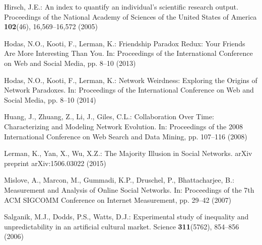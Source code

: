 \documentclass[smallextended]{svjour3}
\begin{document}
\begin{thebibliography}{10}
Hirsch, J.E.: An index to quantify an individual's scientific research output.
\newblock Proceedings of the National Academy of Sciences of the United States
  of America \textbf{102}(46), 16,569--16,572 (2005)

Hodas, N.O., Kooti, F., Lerman, K.: {Friendship Paradox Redux: Your Friends Are
  More Interesting Than You}.
\newblock In: Proceedings of the International Conference on Web and Social
  Media, pp. 8--10 (2013)

Hodas, N.O., Kooti, F., Lerman, K.: {Network Weirdness: Exploring the Origins
  of Network Paradoxes}.
\newblock In: Proceedings of the International Conference on Web and Social
  Media, pp. 8--10 (2014)

Huang, J., Zhuang, Z., Li, J., Giles, C.L.: {Collaboration Over Time:
  Characterizing and Modeling Network Evolution}.
\newblock In: Proceedings of the 2008 International Conference on Web Search
  and Data Mining, pp. 107--116 (2008)

Lerman, K., Yan, X., Wu, X.Z.: {The Majority Illusion in Social Networks}.
\newblock arXiv preprint arXiv:1506.03022  (2015)

Mislove, A., Marcon, M., Gummadi, K.P., Druschel, P., Bhattacharjee, B.:
  {Measurement and Analysis of Online Social Networks}.
\newblock In: Proceedings of the 7th ACM SIGCOMM Conference on Internet
  Measurement, pp. 29--42 (2007)

Salganik, M.J., Dodds, P.S., Watts, D.J.: Experimental study of inequality and
  unpredictability in an artificial cultural market.
\newblock Science \textbf{311}(5762), 854--856 (2006)

\end{thebibliography}
\end{document}
